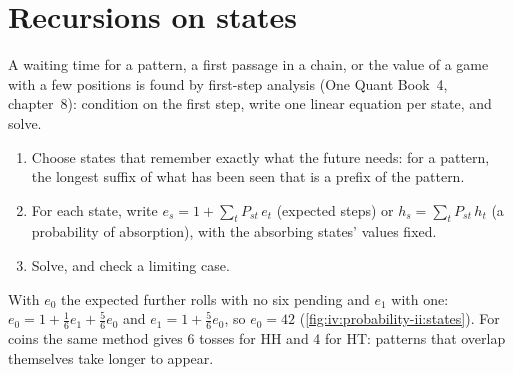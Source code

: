 \section{Recursions on states}

A waiting time for a pattern, a first passage in a chain, or the value of a game with a few positions is
found by first-step analysis (One Quant Book~4, chapter~8): condition on the first step, write one linear
equation per state, and solve.

\begin{method}\label{met:iv:probability-ii:firststep}
\begin{enumerate}
\item Choose states that remember exactly what the future needs: for a pattern, the longest suffix of what has
been seen that is a prefix of the pattern.
\item For each state, write $e_s = 1 + \sum_t P_{st}\, e_t$ (expected steps) or $h_s = \sum_t P_{st}\, h_t$ (a
probability of absorption), with the absorbing states' values fixed.
\item Solve, and check a limiting case.
\end{enumerate}
\end{method}

\begin{example}\label{ex:iv:probability-ii:sixes}
With $e_0$ the expected further rolls with no six pending and $e_1$ with one: $e_0 = 1 + \tfrac16 e_1 + \tfrac56
e_0$ and $e_1 = 1 + \tfrac56 e_0$, so $e_0 = 42$ (\cref{fig:iv:probability-ii:states}). For coins the same method
gives 6 tosses for HH and 4 for HT: patterns that overlap themselves take longer to appear.
\end{example}

\begin{omfigure}

\label{fig:iv:probability-ii:states}
\end{omfigure}

